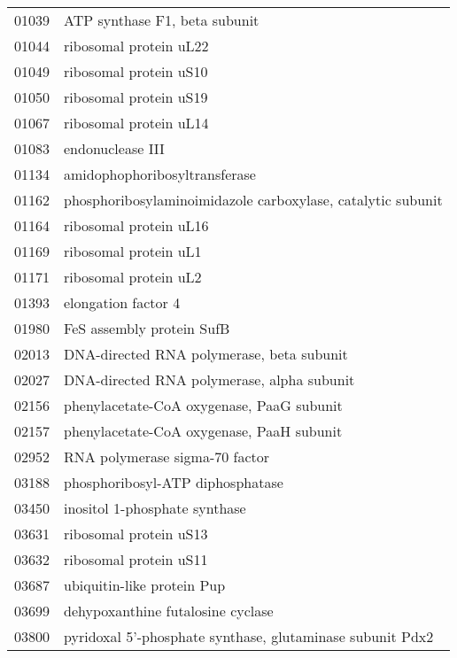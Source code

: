 \begin{longtable}{p{0.25\asdf}p{0.75\asdf}}
			01039	& ATP synthase F1, beta subunit			\\
			01044	& ribosomal protein uL22				\\
			01049	& ribosomal protein uS10				\\
			01050	& ribosomal protein uS19				\\
			01067	& ribosomal protein uL14				\\
			01083	& endonuclease III						\\
			01134	& amidophophoribosyltransferase			\\
			01162	& phosphoribosylaminoimidazole carboxylase, catalytic subunit	\\
			01164	& ribosomal protein uL16 				\\
			01169	& ribosomal protein uL1					\\
			01171	& ribosomal protein uL2					\\
			01393	& elongation factor 4					\\
			01980	& FeS assembly protein SufB				\\
			02013	& DNA-directed RNA polymerase, beta subunit		\\
			02027	& DNA-directed RNA polymerase, alpha subunit	\\
			02156	& phenylacetate-CoA oxygenase, PaaG subunit		\\
			02157	& phenylacetate-CoA oxygenase, PaaH subunit		\\
			02952	& RNA polymerase sigma-70 factor		\\
			03188	& phosphoribosyl-ATP diphosphatase		\\
			03450	& inositol 1-phosphate synthase			\\
			03631	& ribosomal protein uS13				\\
			03632	& ribosomal protein uS11				\\
			03687	& ubiquitin-like protein Pup			\\
			03699	& dehypoxanthine futalosine cyclase		\\
			03800	& pyridoxal 5'-phosphate synthase, glutaminase subunit Pdx2	\\
			\bottomrule
	\end{longtable}

